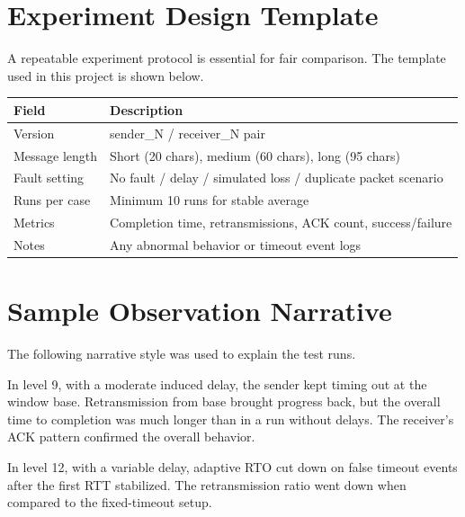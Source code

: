 \section{Experiment Design Template}
A repeatable experiment protocol is essential for fair comparison. The template
used in this project is shown below.

\begin{table}[h]
\centering
{}
\renewcommand{\arraystretch}{1.18}
\begin{tabular}{|p{3.5cm}|p{9.4cm}|}
\hline
\textbf{Field} & \textbf{Description} \\
\hline
Version & sender\_N / receiver\_N pair \\
\hline
Message length & Short (20 chars), medium (60 chars), long (95 chars) \\
\hline
Fault setting & No fault / delay / simulated loss / duplicate packet scenario \\
\hline
Runs per case & Minimum 10 runs for stable average \\
\hline
Metrics & Completion time, retransmissions, ACK count, success/failure \\
\hline
Notes & Any abnormal behavior or timeout event logs \\
\hline
\end{tabular}
\label{tab:experiment-template}
\end{table}

\clearpage
\section{Sample Observation Narrative}
The following narrative style was used to explain the test runs.

\begin{displayquote}
In level 9, with a moderate induced delay, the sender kept timing out at the
window base. Retransmission from base brought progress back, but the overall
time to completion was much longer than in a run without delays. The receiver's
ACK pattern confirmed the overall behavior.
\end{displayquote}

\begin{displayquote}
In level 12, with a variable delay, adaptive RTO cut down on false timeout
events after the first RTT stabilized. The retransmission ratio went down when
compared to the fixed-timeout setup.
\end{displayquote}

